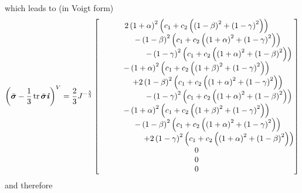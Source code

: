 which leads to (in Voigt form)
\begin{equation}
  \pbrac{\bar{\tensor{\sigma}}-\frac{1}{3}\trace{}{\bar{\tensor{\sigma}}}\tensor{i}}^{V}=\dfrac{2}{3}J^{-\frac{5}{3}}\begin{bmatrix}
    2\pbrac{1+\alpha}^{2}\pbrac{c_{1}+c_{2}\pbrac{\pbrac{1-\beta}^{2}+\pbrac{1-\gamma}^{2}}}\\
    \hspace{1cm}-\pbrac{1-\beta}^{2}\pbrac{c_{1}+c_{2}\pbrac{\pbrac{1+\alpha}^{2}+\pbrac{1-\gamma}^{2}}}\\
    \hspace{2cm}-\pbrac{1-\gamma}^{2}\pbrac{c_{1}+c_{2}\pbrac{\pbrac{1+\alpha}^{2}+\pbrac{1-\beta}^{2}}} \\
    -\pbrac{1+\alpha}^{2}\pbrac{c_{1}+c_{2}\pbrac{\pbrac{1+\beta}^{2}+\pbrac{1-\gamma}^{2}}}\\
    \hspace{1cm}+2\pbrac{1-\beta}^{2}\pbrac{c_{1}+c_{2}\pbrac{\pbrac{1+\alpha}^{2}+\pbrac{1-\gamma}^{2}}}\\
    \hspace{2cm}-\pbrac{1-\gamma}^{2}\pbrac{c_{1}+c_{2}\pbrac{\pbrac{1+\alpha}^{2}+\pbrac{1-\beta}^{2}}} \\
    -\pbrac{1+\alpha}^{2}\pbrac{c_{1}+c_{2}\pbrac{\pbrac{1+\beta}^{2}+\pbrac{1-\gamma}^{2}}}\\
    \hspace{1cm}-\pbrac{1-\beta}^{2}\pbrac{c_{1}+c_{2}\pbrac{\pbrac{1+\alpha}^{2}+\pbrac{1-\gamma}^{2}}}\\
    \hspace{2cm}+2\pbrac{1-\gamma}^{2}\pbrac{c_{1}+c_{2}\pbrac{\pbrac{1+\alpha}^{2}+\pbrac{1-\beta}^{2}}}\\
    0 \\
    0 \\
    0
  \end{bmatrix}
\end{equation}
and therefore
